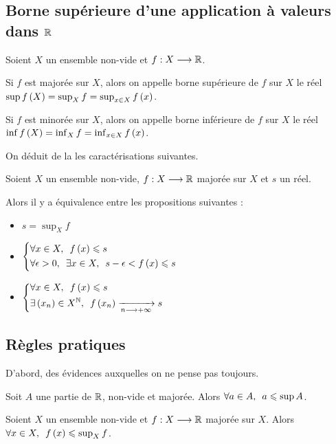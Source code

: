 \subsection{Borne supérieure d'une application à valeurs dans \(\mathbb{R}\)}

\begin{defi}
Soient \(X\) un ensemble non-vide et \(f:X\longrightarrow\mathbb{R}\).

Si \(f\) est majorée sur \(X\), alors on appelle borne supérieure de \(f\) sur \(X\) le réel \(\sup f\left(X\right)=\sup_Xf=\sup_{x\in X}f\left(x\right)\).

Si \(f\) est minorée sur \(X\), alors on appelle borne inférieure de \(f\) sur \(X\) le réel \(\inf f\left(X\right)=\inf_Xf=\inf_{x\in X}f\left(x\right)\).
\end{defi}

On déduit de la  les caractérisations suivantes.

\begin{prop}
Soient \(X\) un ensemble non-vide, \(f:X\longrightarrow\mathbb{R}\) majorée sur \(X\) et \(s\) un réel.

Alors il y a équivalence entre les propositions suivantes :

\begin{itemize}
    \item \(s=\sup_Xf\) \\
    \item \(\begin{dcases}\quantifs{\forall x\in X}f\paren{x}\leq s \\ \quantifs{\forall\epsilon>0;\exists x\in X}s-\epsilon<f\paren{x}\leq s\end{dcases}\) \\
    \item \(\begin{dcases}\quantifs{\forall x\in X}f\paren{x}\leq s \\ \quantifs{\exists\paren{x_n}\in X^\N}f\paren{x_n}\tendqd{n\to\pinf}s\end{dcases}\)
\end{itemize}
\end{prop}

\subsection{Règles pratiques}

D'abord, des évidences auxquelles on ne pense pas toujours.

\begin{prop}
Soit \(A\) une partie de \(\mathbb{R}\), non-vide et majorée. Alors \(\quantifs{\forall a\in A}a\leq\sup A\).

Soient \(X\) un ensemble non-vide et \(f:X\longrightarrow\mathbb{R}\) majorée sur \(X\). Alors \(\quantifs{\forall x\in X}f\paren{x}\leq\sup_Xf\).
\end{prop}

